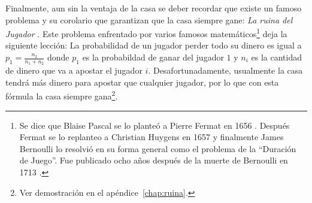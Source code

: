 \begin{table}[ht]
\centering
{}
\caption{Ventajas de la casa para juegos populares de casino \cite{hannum2005practical}}
\label{ventaja-casa}
\end{table}

Finalmente, aun sin la ventaja de la casa se deber recordar que existe un famoso problema y su corolario que garantizan que la casa siempre gane: \emph{La ruina del Jugador} \cite[p.~95-99]{ross2006first}. Este problema enfrentado por varios famosos matemáticos\footnote{Se dice que Blaise Pascal se lo planteó a Pierre Fermat en 1656 \cite{edwards1983pascal}. Después Fermat se lo replanteo a Christian Huygens en 1657 y finalmente James Bernoulli lo resolvió en su forma general como el problema de la ``Duración de Juego''. Fue publicado ocho años después de la muerte de Bernoulli en 1713 \cite[p.~98]{ross2006first}.} deja la siguiente lección: La probabilidad de un jugador perder todo su dinero es igual a  $p_1 = \frac{n_2}{n_1 + n_2}$ donde $p_1$ es la probabildad de ganar del jugador $1$ y $n_i$ es la cantidad de dinero que va a apostar el jugador $i$. Desafortunadamente, usualmente la casa tendrá más dinero para apostar que cualquier jugador, por lo que con esta fórmula la casa siempre gana\footnote{Ver demostración en el apéndice~\ref{chap:ruina}.}.


